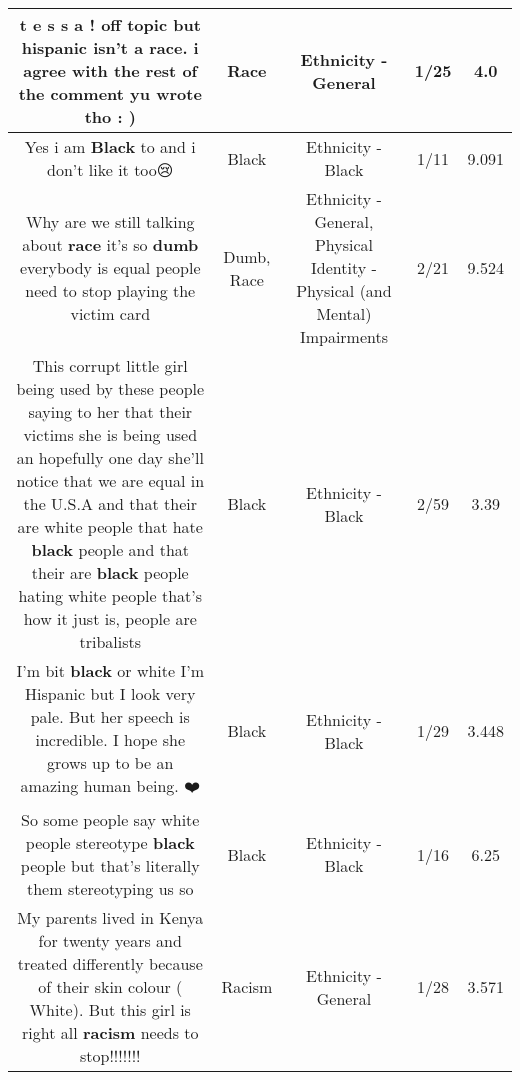 \documentclass[11pt]{article}
\newlength\mylength
\begin{document}
\begin{center}
\begin{longtable}{|C{.65\mylength}|C{.30\mylength}|C{.12\mylength}|C{.12\mylength}|C{.12\mylength}|}
  \small t e s s a ! off topic but hispanic isn't a \textbf{race}. i agree with the rest of the comment yu wrote tho  : )\normalsize   & Race & Ethnicity - General & 1/25 & 4.0 \\  \hline
  \small Yes i am \textbf{Black} to and i don't like it too😢\normalsize   & Black & Ethnicity - Black & 1/11 & 9.091 \\  \hline
  \small Why are we still talking about \textbf{race} it's so \textbf{dumb} everybody is equal people need to stop playing the victim card\normalsize   & Dumb, Race & Ethnicity - General, Physical Identity - Physical (and Mental) Impairments & 2/21 & 9.524 \\  \hline
  \small This corrupt little girl being used by these people saying to her that their victims she is being used an hopefully one day she'll notice that we are equal in the U.S.A and that their are white people that hate \textbf{black} people and that their are \textbf{black} people hating white people that's how it just is, people are tribalists\normalsize   & Black & Ethnicity - Black & 2/59 & 3.39 \\  \hline
  \small I'm bit \textbf{black} or white I'm Hispanic but I look very pale. But her speech is incredible. I hope she grows up to be an amazing human being. ❤️\normalsize   & Black & Ethnicity - Black & 1/29 & 3.448 \\  \hline
  \small So some people say white people stereotype \textbf{black} people but that's literally them stereotyping us so\normalsize   & Black & Ethnicity - Black & 1/16 & 6.25 \\  \hline
  \small My parents lived in Kenya for twenty years and treated differently because of their skin colour ( White). But this girl is right all \textbf{racism} needs to stop!!!!!!!\normalsize   & Racism & Ethnicity - General & 1/28 & 3.571 \\  \hline

\end{longtable}
\end{center}
\end{document}
